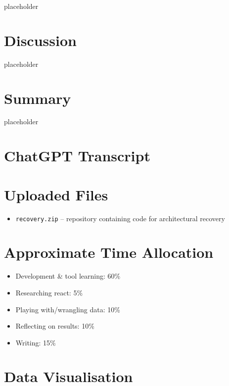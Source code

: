 \documentclass{article}
\begin{document}
placeholder




\section{Discussion}
placeholder


\section{Summary}
placeholder





\clearpage
\appendix
\section{ChatGPT Transcript}
\label{apx:a}
\begin{figure}[h]

\end{figure}


\clearpage
\section{Uploaded Files}
\label{apx:b}
\begin{itemize}
  \item \verb|recovery.zip| -- repository containing code for architectural recovery
\end{itemize}

\clearpage
\section{Approximate Time Allocation}
\label{apx:c}
\begin{itemize}
  \item Development \& tool learning: 60\%
  \item Researching react: 5\%
  \item Playing with/wrangling data: 10\%
  \item Reflecting on results: 10\%
  \item Writing: 15\%
\end{itemize}

\clearpage
\section{Data Visualisation}
\label{apx:d}
\end{document}
